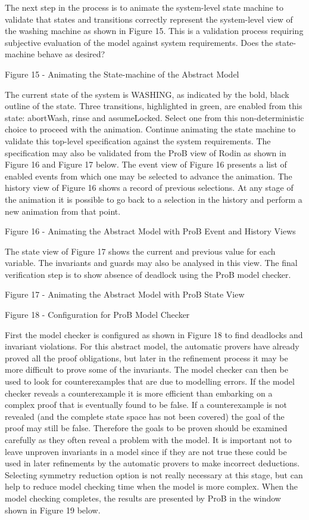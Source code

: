 The next step in the process is to animate the system-level state machine to validate that states and transitions correctly represent the system-level view of the washing machine as shown in Figure 15. This is a validation process requiring subjective evaluation of the model against system requirements. Does the state-machine behave as desired?
 
Figure 15 - Animating the State-machine of the Abstract Model

The current state of the system is WASHING, as indicated by the bold, black outline of the state. Three transitions, highlighted in green, are enabled from this state: abortWash, rinse and assumeLocked. Select one from this non-deterministic choice to proceed with the animation. Continue animating the state machine to validate this top-level specification against the system requirements.
The specification may also be validated from the ProB view of Rodin as shown in Figure 16 and Figure 17 below. The event view of Figure 16 presents a list of enabled events from which one may be selected to advance the animation. The history view of Figure 16 shows a record of previous selections. At any stage of the animation it is possible to go back to a selection in the history and perform a new animation from that point.
 
Figure 16 - Animating the Abstract Model with ProB Event and History Views

The state view of Figure 17 shows the current and previous value for each variable. The invariants and guards may also be analysed in this view.
The final verification step is to show absence of deadlock using the ProB model checker.

Figure 17 - Animating the Abstract Model with ProB State View
 
Figure 18 - Configuration for ProB Model Checker

First the model checker is configured as shown in Figure 18 to find deadlocks and invariant violations. For this abstract model, the automatic provers have already proved all the proof obligations, but later in the refinement process it may be more difficult to prove some of the invariants. The model checker can then be used to look for counterexamples that are due to modelling errors. If the model checker reveals a counterexample it is more efficient than embarking on a complex proof that is eventually found to be false. If a counterexample is not revealed (and the complete state space has not been covered) the goal of the proof may still be false. Therefore the goals to be proven should be examined carefully as they often reveal a problem with the model. 
It is important not to leave unproven invariants in a model since if they are not true these could be used in later refinements by the automatic provers to make incorrect deductions.
Selecting symmetry reduction option is not really necessary at this stage, but can help to reduce model checking time when the model is more complex.
When the model checking completes, the results are presented by ProB in the window shown in Figure 19 below.
 
